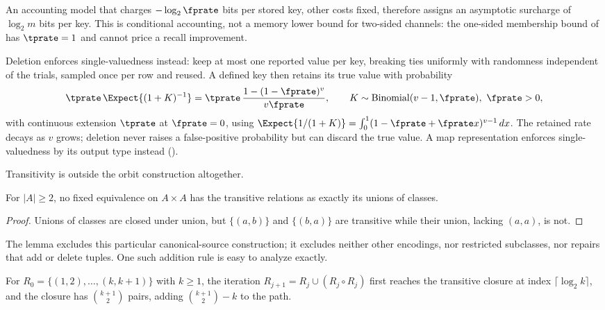 An accounting model that charges $-\log_2 \fprate$ bits per stored key, other
costs fixed, therefore assigns an asymptotic surcharge of $\log_2 m$ bits per key.
This is conditional accounting, not a memory lower bound for two-sided channels:
the one-sided membership bound of  has $\tprate = 1$
and cannot price a recall improvement.

Deletion enforces single-valuedness instead: keep at most one reported value per
key, breaking ties uniformly with randomness independent of the trials, sampled
once per row and reused. A defined key then retains its true value with
probability
\[
  \tprate\, \Expect{(1 + K)^{-1}}
  = \tprate\, \frac{1 - (1 - \fprate)^{v}}{v \fprate},
  \qquad K \sim \mathrm{Binomial}(v - 1, \fprate),\ \fprate > 0,
\]
with continuous extension $\tprate$ at $\fprate = 0$, using $\Expect{1/(1 + K)} =
\int_0^1 (1 - \fprate + \fprate x)^{v - 1}\, dx$. The retained rate decays as $v$
grows; deletion never raises a false-positive probability but can discard the
true value. A map representation enforces single-valuedness by its output type
instead ().

Transitivity is outside the orbit construction altogether.

\begin{lemma}
\label{lem:rel-no-quotient}
For $|A| \ge 2$, no fixed equivalence on $A \times A$ has the transitive relations
as exactly its unions of classes.
\end{lemma}

\begin{proof}
Unions of classes are closed under union, but $\{(a, b)\}$ and $\{(b, a)\}$ are
transitive while their union, lacking $(a, a)$, is not.
\end{proof}

The lemma excludes this particular canonical-source construction; it excludes
neither other encodings, nor restricted subclasses, nor repairs that add or delete
tuples. One such addition rule is easy to analyze exactly.

\begin{theorem}
\label{thm:rel-path-cascade}
For $R_0 = \{(1, 2), \ldots, (k, k + 1)\}$ with $k \ge 1$, the iteration $R_{j+1}
= R_j \cup (R_j \circ R_j)$ first reaches the transitive closure at index $\lceil
\log_2 k \rceil$, and the closure has $\binom{k+1}{2}$ pairs, adding
$\binom{k+1}{2} - k$ to the path.
\end{theorem}

